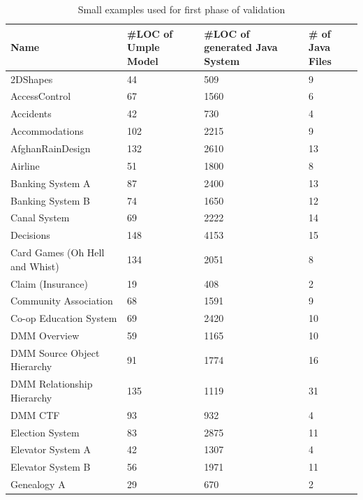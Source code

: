 

\begin{table}[h]
\caption{Small examples used for first phase of validation}
\label{table:umpleexamples}
\begin{tabularx}{\textwidth}{l|YYY}
\toprule
{}
\textbf{Name} & \textbf{\#LOC of Umple Model} & \textbf{\#LOC of generated Java System} & \textbf{\# of Java Files} \\ \hline
2DShapes & 44 & 509 & 9\\ \hline
AccessControl & 67 & 1560 & 6\\ \hline
Accidents & 42 & 730 & 4\\ \hline
Accommodations & 102 & 2215 & 9\\ \hline
AfghanRainDesign & 132 & 2610 & 13\\ \hline
Airline & 51 & 1800 & 8\\ \hline
Banking System A & 87 & 2400 & 13\\ \hline
Banking System B & 74 & 1650 & 12\\ \hline
Canal System & 69 & 2222 & 14\\ \hline
Decisions & 148 & 4153 & 15\\ \hline
Card Games (Oh Hell and Whist) & 134 & 2051 & 8\\ \hline
Claim (Insurance) & 19 & 408 & 2\\ \hline
Community Association & 68 & 1591 & 9\\ \hline
Co-op Education System & 69 & 2420 & 10\\ \hline
DMM Overview & 59 & 1165 & 10\\ \hline
DMM Source Object Hierarchy & 91 & 1774 & 16\\ \hline
DMM Relationship Hierarchy & 135 & 1119 & 31\\ \hline
DMM CTF & 93 & 932 & 4\\ \hline
Election System & 83 & 2875 & 11\\ \hline
Elevator System A & 42 & 1307 & 4\\ \hline
Elevator System B & 56 & 1971 &11\\ \hline
Genealogy A & 29 & 670 & 2\\ \hline

\end{tabularx}
\end{table}
